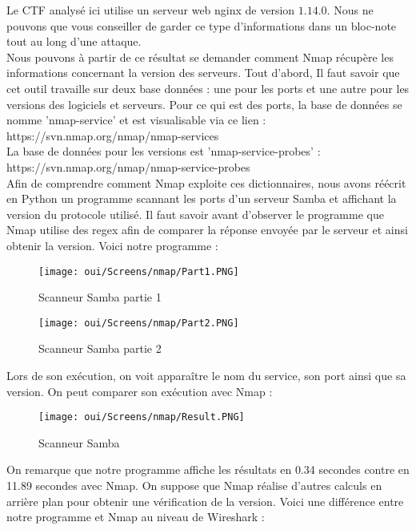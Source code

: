 Le CTF analysé ici utilise un serveur web nginx de version $1.14.0$. Nous ne pouvons que vous conseiller de garder ce type d’informations dans un bloc-note tout au long d’une attaque.\\
Nous pouvons à partir de ce résultat se demander comment Nmap récupère les informations concernant la version des serveurs. Tout d'abord, Il faut savoir que cet outil travaille sur deux base données : une pour les ports et une autre pour les versions des logiciels et serveurs. Pour ce qui est des ports, la base de données se nomme 'nmap-service' et est visualisable via ce lien :\\
https://svn.nmap.org/nmap/nmap-services\\
La base de données pour les versions est 'nmap-service-probes' :\\
https://svn.nmap.org/nmap/nmap-service-probes\\
Afin de comprendre comment Nmap exploite ces dictionnaires, nous avons réécrit en Python un programme scannant les ports d'un serveur Samba et affichant la version du protocole utilisé. Il faut savoir avant d'observer le programme que Nmap utilise des regex afin de comparer la réponse envoyée par le serveur et ainsi obtenir la version. Voici notre programme :

\begin{figure}[htp!]
  \centering
  \setlength\figureheight{7cm}
  \setlength\figurewidth{9cm}
  \texttt{[image: oui/Screens/nmap/Part1.PNG]}
  \caption{Scanneur Samba partie 1}
  \label{fig:courbe-tikz}
\end{figure}

\begin{figure}[htp!]
  \centering
  \setlength\figureheight{7cm}
  \setlength\figurewidth{9cm}
  \texttt{[image: oui/Screens/nmap/Part2.PNG]}
  \caption{Scanneur Samba partie 2}
  \label{fig:courbe-tikz}
\end{figure}

\newpage
Lors de son exécution, on voit apparaître le nom du service, son port ainsi que sa version. On peut comparer son exécution avec Nmap :

\begin{figure}[htp!]
  \centering
  \setlength\figureheight{7cm}
  \setlength\figurewidth{9cm}
  \texttt{[image: oui/Screens/nmap/Result.PNG]}
  \caption{Scanneur Samba}
  \label{fig:courbe-tikz}
\end{figure}

\newpages
On remarque que notre programme affiche les résultats en 0.34 secondes contre en 11.89 secondes avec Nmap. On suppose que Nmap réalise d'autres calculs en arrière plan pour obtenir une vérification de la version. Voici une différence entre notre programme et Nmap au niveau de Wireshark :

